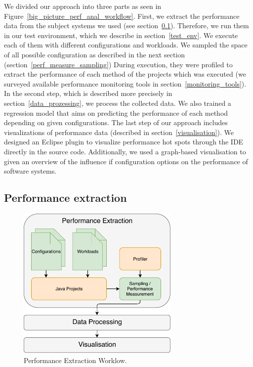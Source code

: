 We divided our approach into three parts as seen in Figure~\ref{big_picture_perf_anal_workflow}. First, we extract the performance data from the subject systems we used (see section~\ref{perf_extr}). Therefore, we run them in our test environment, which we describe in section~\ref{test_env}. We execute each of them with different configurations and workloads. We sampled the space of all possible configuration as described in the next section (section~\ref{perf_measure_sampling}) During execution, they were profiled to extract the performance of each method of the projects which was executed (we surveyed available performance monitoring tools in section~\ref{monitoring_tools}). In the second step, which is described more precisely in section~\ref{data_prozessing}, we process the collected data. We also trained a regression model that aims on predicting the performance of each method depending on given configurations. The last step of our approach includes visualizations of performance data (described in section~\ref{visualisation}). We designed an Eclipse plugin to visualize performance hot spots through the \ac{IDE} directly in the source code. Additionally, we used a graph-based visualisation to given an overview of the influence if configuration options on the performance of software systems.


\subsection{Performance extraction}
\label{perf_extr}

\begin{figure}
  \centering
  \includegraphics[width=0.7\textwidth]{images/workflow_perf_expanded}
  \caption{Performance Extraction Worklow.}
  \label{perf_extr_workflow}
\end{figure}


